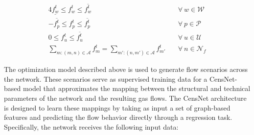 \begin{alignat}{4}
    \underline{f_{w}^t} \leq f_{w}^t \leq \overline{f_{w}^t} &\quad \forall \ w \in \mathcal{W} \label{eq:well_limits} \\
    -\overline{f_{p}^t} \leq f_{p}^t \leq \overline{f_{p}^t} &\quad \forall \ p \in \mathcal{P} \label{eq:pipe_limits} \\
    0 \leq f_{u}^{t} \leq \overline{f_{u}^{t}} &\quad \forall \ u \in \mathcal{U} \label{eq:dem_limit_gas} \\
    \sum_{m:(m,n)\in\mathcal{A}}{f_{m}^t} = \sum_{m':(n,m')\in\mathcal{A}}{f_{m'}^t} &\quad \forall \ n \in \mathcal{N}_f \label{eq:gas_balance}
\end{alignat}

The optimization model described above is used to generate flow scenarios across the network. These scenarios serve as supervised training data for a CensNet-based model that approximates the mapping between the structural and technical parameters of the network and the resulting gas flows. The CensNet architecture is designed to learn these mappings by taking as input a set of graph-based features and predicting the flow behavior directly through a regression task. Specifically, the network receives the following input data:


